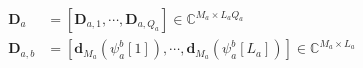 \begin{align}
\mathbf{D}_{a} &=\left[\mathbf{D}_{a, 1}, \cdots, \mathbf{D}_{a, Q_{a}}\right] \in \mathbb{C}^{M_{a} \times L_{a} Q_{a}} \\
\mathbf{D}_{a, b} &=\left[\mathbf{d}_{M_{a}}\left(\psi_{a}^{b}[1]\right), \cdots, \mathbf{d}_{M_{a}}\left(\psi_{a}^{b}\left[L_{a}\right]\right)\right] \in \mathbb{C}^{M_{a} \times L_{a}}
\end{align}







